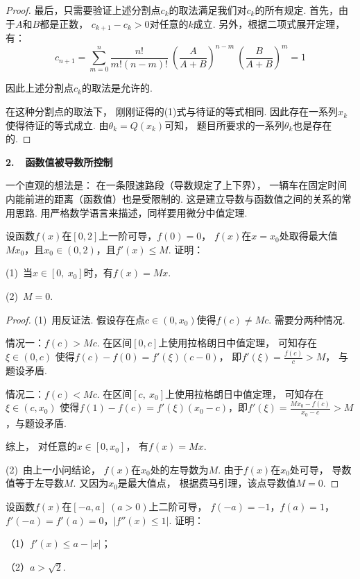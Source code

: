 \begin{proof}
最后，只需要验证上述分割点$c_k$的取法满足我们对$c_k$的所有规定.
首先，由于$A$和$B$都是正数，
$c_{k+1} - c_{k} > 0$对任意的$k$成立.
另外，根据二项式展开定理，有：
$$
c_{n+1} = \sum_{m=0}^{n} \frac{n!}{m!(n-m)!} ~\left(\frac{A}{A+B}\right)^{n-m} ~\left(\frac{B}{A+B}\right)^m = 1
$$

因此上述分割点$c_k$的取法是允许的. \par
在这种分割点的取法下，
刚刚证得的(1)式与待证的等式相同.
因此存在一系列$x_k$使得待证的等式成立.
由$\theta_k = Q(x_k)$可知，
题目所要求的一系列$\theta_k$也是存在的.
\end{proof}

\textbf{2.~~函数值被导数所控制}\vspace{0.5em}

一个直观的想法是：
在一条限速路段（导数规定了上下界），
一辆车在固定时间内能前进的距离（函数值）也是受限制的.
这是建立导数与函数值之间的关系的常用思路.
用严格数学语言来描述，同样要用微分中值定理.

\begin{example}
\label{ex:ch04-35}
设函数$f(x)$在$[0,2]$上一阶可导，$f(0) = 0$，
$f(x)$在$x = x_0$处取得最大值$Mx_0$，且$x_0 \in (0,2)$，且$f'(x) \le M$.
证明：

(1)~当$x \in [0,~x_0]$时，有$f(x) = Mx$.\par
(2)~$M=0$.
\end{example}

\begin{proof}
(1)~用反证法.
假设存在点$c \in (0,x_0)$使得$f(c) \ne Mc$.
需要分两种情况.

情况一：$f(c) > Mc$.
在区间$[0,c]$上使用拉格朗日中值定理，
可知存在$\xi \in (0,c)$
使得$f(c)-f(0) = f'(\xi) (c-0)$，
即$f'(\xi) = \frac{f(c)}{c} > M$，
与题设矛盾.

情况二：$f(c) < Mc$.
在区间$[c,~x_0]$上使用拉格朗日中值定理，
可知存在$\xi \in (c,x_0)$
使得$f(1) - f(c) = f'(\xi) (x_0-c)$，即$f'(\xi) = \frac{Mx_0 - f(c)}{x_0 - c} > M$，与题设矛盾.\par
综上，
对任意的$x \in [0,x_0]$，
有$f(x) = Mx$.

(2)~由上一小问结论，
$f(x)$在$x_0$处的左导数为$M$.
由于$f(x)$在$x_0$处可导，
导数值等于左导数$M$.
又因为$x_0$是最大值点，
根据费马引理，该点导数值$M=0$.
\end{proof}

\begin{example}
\label{ex:ch04-36}
设函数$f(x)$在$[-a,a]~(a > 0)$上二阶可导，
$f(-a) = -1$，$f(a) = 1$，$f'(-a) = f'(a) = 0$，$|f''(x) \le 1|$.
证明：\par
（1）$f'(x) \le a - |x|$；\par
（2）$a > \sqrt{2}$.
\end{example}

